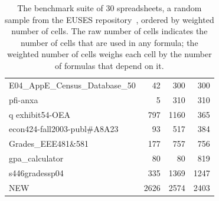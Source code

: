 \begin{table}[t!]
\begin{tabular}{l|rrr}
\small{E04\_AppE\_Census\_Database\_50} & \small{42} & \small{300} & \small{300} \\ 
\small{pfi-anxa} & \small{5} & \small{310} & \small{310} \\ 
\small{q exhibit54-OEA} & \small{797} & \small{1160} & \small{365} \\ 
\small{econ424-fall2003-publ\#A8A23} & \small{93} & \small{517} & \small{384} \\ 
\small{Grades\_EEE481\&581} & \small{177} & \small{757} & \small{756} \\ 
\small{gpa\_calculator} & \small{80} & \small{80} & \small{819} \\ 
\small{s446gradessp04} & \small{335} & \small{1369} & \small{1247} \\ 
\small{NEW} & \small{2626} & \small{2574} & \small{2403} \\ 
    \hline
    \end{tabular}%
  \caption{The benchmark suite of 30 spreadsheets, a random sample from the EUSES repository~\cite{Fisher:2005:ESC:1082983.1083242}, ordered by weighted number of cells. The raw number of cells indicates the number of cells that are used in any formula; the weighted number of cells weighs each cell by the number of formulas that depend on it.\label{tab:spreadsheet_characteristics}}
\end{table}
